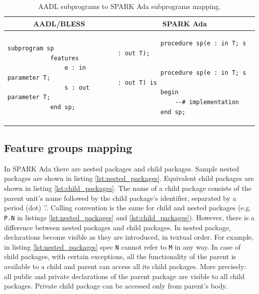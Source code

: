 \singlespacing
\begin{table}[!ht]
	\caption{AADL subprograms to SPARK Ada subprograms mapping.}
	\label{table:subprograms_mapping}
	\centering
  	\begin{tabular}{ | p{3in} | p{3in} |}

		\hline
		\multicolumn{1}{|c|}{\textbf{AADL/BLESS}} & \multicolumn{1}{|c|}{\textbf{SPARK Ada}} \\ \hline

		\begin{lstlisting}[language=aadl]
			subprogram sp
			features
				e : in parameter T;
				s : out parameter T;
			end sp;
		\end{lstlisting} 
		& 
		\begin{lstlisting}
			procedure sp(e : in T; s : out T);

			procedure sp(e : in T; s : out T) is 
			begin
				--# implementation
			end sp;
		\end{lstlisting} 		

		\\ \hline
	\end{tabular}
\end{table}
\doublespacing


\subsection{Feature groups mapping}
\label{codegen:mapping:feature_groups}

In SPARK Ada there are nested packages and child packages. Sample nested packages are shown in listing \ref{lst:nested_packages}. Equivalent child packages are shown in listing \ref{lst:child_packages}. The name of a child package consists of the parent unit's name followed by the child package's identifier, separated by a period (dot) '.'. Calling convention is the same for child and nested packages (e.g. \lstinline{P.N} in listings \ref{lst:nested_packages} and \ref{lst:child_packages}). However, there is a difference between nested packages and child packages. In nested package, declarations become visible as they are introduced, in textual order. For example, in listing \ref{lst:nested_packages} spec \lstinline{N} cannot refer to \lstinline{M} in any way. In case of child packages, with certain exceptions, all the functionality of the parent is available to a child and parent can access all its child packages. More precisely: all public and private declarations of the parent package are visible to all child packages. Private child package can be accessed only from parent's body.

